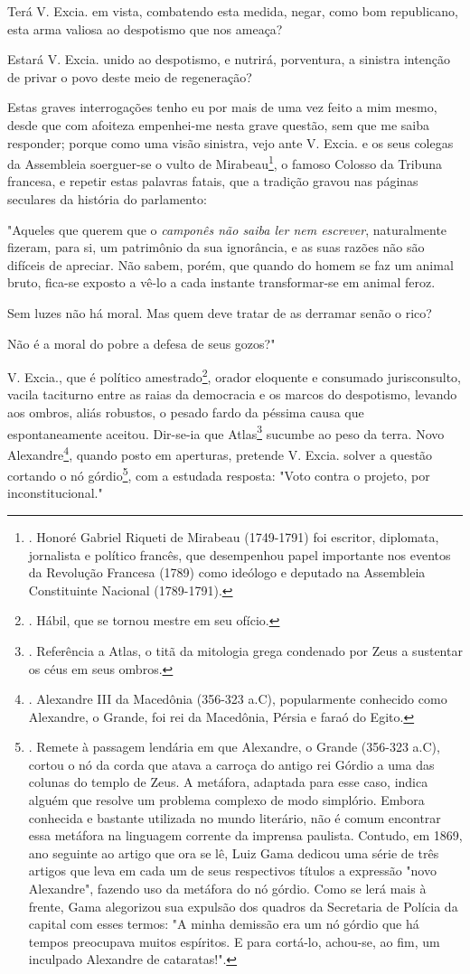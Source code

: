 Terá V. Excia. em vista, combatendo esta medida, negar, como bom
republicano, esta arma valiosa ao despotismo que nos ameaça?

Estará V. Excia. unido ao despotismo, e nutrirá, porventura, a sinistra
intenção de privar o povo deste meio de regeneração?

Estas graves interrogações tenho eu por mais de uma vez feito a mim
mesmo, desde que com afoiteza empenhei-me nesta grave questão, sem que
me saiba responder; porque como uma visão sinistra, vejo ante V. Excia.
e os seus colegas da Assembleia soerguer-se o vulto de
Mirabeau\footnote{. Honoré Gabriel Riqueti de Mirabeau (1749-1791) foi
  escritor, diplomata, jornalista e político francês, que desempenhou
  papel importante nos eventos da Revolução Francesa (1789) como
  ideólogo e deputado na Assembleia Constituinte Nacional (1789-1791).},
o famoso Colosso da Tribuna francesa, e repetir estas palavras fatais,
que a tradição gravou nas páginas seculares da história do parlamento:

"Aqueles que querem que o \emph{camponês não saiba ler nem escrever},
naturalmente fizeram, para si, um patrimônio da sua ignorância, e as
suas razões não são difíceis de apreciar. Não sabem, porém, que quando
do homem se faz um animal bruto, fica-se exposto a vê-lo a cada instante
transformar-se em animal feroz.

Sem luzes não há moral. Mas quem deve tratar de as derramar senão o
rico?

Não é a moral do pobre a defesa de seus gozos?"

V. Excia., que é político amestrado\footnote{. Hábil, que se tornou
  mestre em seu ofício.}, orador eloquente e consumado jurisconsulto,
vacila taciturno entre as raias da democracia e os marcos do despotismo,
levando aos ombros, aliás robustos, o pesado fardo da péssima causa que
espontaneamente aceitou. Dir-se-ia que Atlas\footnote{. Referência a
  Atlas, o titã da mitologia grega condenado por Zeus a sustentar os
  céus em seus ombros.} sucumbe ao peso da terra. Novo
Alexandre\footnote{. Alexandre III da Macedônia (356-323 a.C),
  popularmente conhecido como Alexandre, o Grande, foi rei da Macedônia,
  Pérsia e faraó do Egito.}, quando posto em aperturas, pretende V.
Excia. solver a questão cortando o nó górdio\footnote{. Remete à
  passagem lendária em que Alexandre, o Grande (356-323 a.C), cortou o
  nó da corda que atava a carroça do antigo rei Górdio a uma das colunas
  do templo de Zeus. A metáfora, adaptada para esse caso, indica alguém
  que resolve um problema complexo de modo simplório. Embora conhecida e
  bastante utilizada no mundo literário, não é comum encontrar essa
  metáfora na linguagem corrente da imprensa paulista. Contudo, em 1869,
  ano seguinte ao artigo que ora se lê, Luiz Gama dedicou uma série de
  três artigos que leva em cada um de seus respectivos títulos a
  expressão "novo Alexandre", fazendo uso da metáfora do nó górdio. Como
  se lerá mais à frente, Gama alegorizou sua expulsão dos quadros da
  Secretaria de Polícia da capital com esses termos: "A minha demissão
  era um nó górdio que há tempos preocupava muitos espíritos. E para
  cortá-lo, achou-se, ao fim, um inculpado Alexandre de cataratas!".},
com a estudada resposta: "Voto contra o projeto, por inconstitucional."

